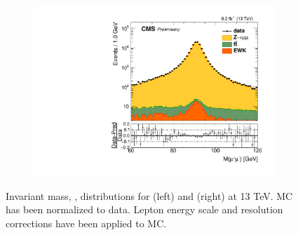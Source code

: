 \begin{figure}
\begin{subfigure}{.50\textwidth}
\end{subfigure}%
\centering
\begin{subfigure}{.50\textwidth}
\centering
\includegraphics[width=\linewidth]{plots/Z/13tev/zmmlog.pdf}
\end{subfigure}%
\caption{Invariant mass, \mll, distributions for \zee (left) and \zmm (right) at 13 TeV. MC has been normalized to data. Lepton energy scale and resolution corrections have been applied to MC.}
\label{fig:z:z:13}
\end{figure}